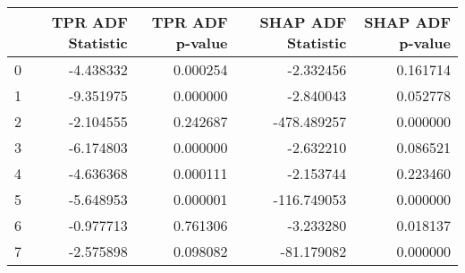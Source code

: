 \begin{tabular}{lrrrr}
\toprule
 & TPR ADF Statistic & TPR ADF p-value & SHAP ADF Statistic & SHAP ADF p-value \\
\midrule
0 & -4.438332 & 0.000254 & -2.332456 & 0.161714 \\
1 & -9.351975 & 0.000000 & -2.840043 & 0.052778 \\
2 & -2.104555 & 0.242687 & -478.489257 & 0.000000 \\
3 & -6.174803 & 0.000000 & -2.632210 & 0.086521 \\
4 & -4.636368 & 0.000111 & -2.153744 & 0.223460 \\
5 & -5.648953 & 0.000001 & -116.749053 & 0.000000 \\
6 & -0.977713 & 0.761306 & -3.233280 & 0.018137 \\
7 & -2.575898 & 0.098082 & -81.179082 & 0.000000 \\
\bottomrule
\end{tabular}
